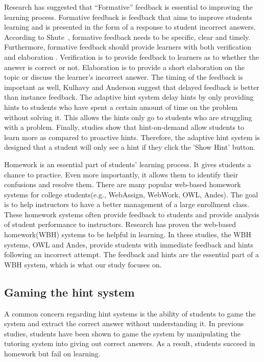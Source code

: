 \documentclass{sigchi}
\begin{document}
Research has suggested that ``Formative'' feedback is essential to improving the learning process\cite{Azevedo1995}\cite{Bangert-Drowns1991}. Formative feedback is feedback that aims to improve students learning and is presented in the form of a response to student incorrect answers\cite{Shute2008}. According to Shute~\cite{Shute2008}, formative feedback needs to be specific, clear and timely. Furthermore, formative feedback should provide learners with both verification and elaboration \cite{Mason2001} \cite{Bangert-Drowns1991}. Verification is to provide feedback to learners as to whether the answer is correct or not. Elaboration is to provide a short elaboration on the topic or discuss the learner's incorrect answer. The timing of the feedback is important as well, Kulhavy and Anderson suggest that delayed feedback is better than instance feedback\cite{Kulhavy1972}. The adaptive hint system delay hints by only providing hints to students who have spent a certain amount of time on the problem without solving it. This allows the hints only go to students who are struggling with a problem. Finally, studies show that hint-on-demand allow students to learn more as compared to proactive hints\cite{Razzaq2010}. Therefore, the adaptive hint system is designed that a student will only see a hint if they click the 'Show Hint' button.

Homework is an essential part of students' learning process\cite{Cooper2006}. It gives students a chance to practice. Even more importantly, it allows them to identify their confusions and resolve them. There are many popular web-based homework systems for college students(e.g., WebAssign, WebWork, OWL, Andes). The goal is to help instructors to have a better management of a large enrollment class. These homework systems often provide feedback to students and provide analysis of student performance to instructors. Research has proven the web-based homework(WBH) systems to be helpful in learning\cite{MestHartRath2002}\cite{Vanlehn2005}. In these studies, the WBH systems, OWL and Andes, provide students with immediate feedback and hints following an incorrect attempt\cite{MestHartRath2002}\cite{Vanlehn2005}. The feedback and hints are the essential part of a WBH system, which is what our study focuses on.

\subsection*{Gaming the hint system}

A common concern regarding hint systems is the ability of students to game the system and extract the correct answer without understanding it\cite{Baker2004}\cite{Baker2005}. In previous studies, students have been shown to game the system by manipulating the tutoring system into giving out correct answers\cite{Baker2004Off-task}. As a result, students succeed in homework but fail on learning.
\end{document}
